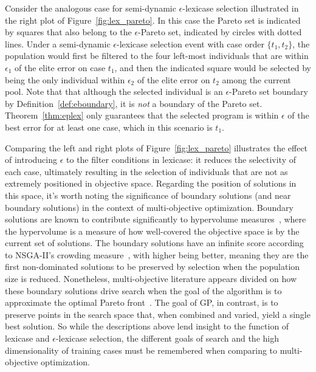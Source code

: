 \documentclass[twoside]{article}
\begin{document}
Consider the analogous case for semi-dynamic $\epsilon$-lexicase selection illustrated in the right plot of Figure~\ref{fig:lex_pareto}. In this case the Pareto set is indicated by squares that also belong to the $\epsilon$-Pareto set, indicated by circles with dotted lines. Under a semi-dynamic $\epsilon$-lexicase selection event with case order $\{t_1, t_2\}$, the population would first be filtered to the four left-most individuals that are within $\epsilon_1$ of the elite error on case $t_1$, and then the indicated square would be selected by being the only individual within $\epsilon_2$ of the elite error on $t_2$ among the current pool. Note that that although the selected individual is an $\epsilon$-Pareto set boundary by Definition~\ref{def:eboundary}, it is {\it not} a boundary of the Pareto set. Theorem~\ref{thm:eplex} only guarantees that the selected program is within $\epsilon$ of the best error for at least one case, which in this scenario is $t_1$. 

Comparing the left and right plots of Figure~\ref{fig:lex_pareto} illustrates the effect of introducing $\epsilon$ to the filter conditions in lexicase: it reduces the selectivity of each case, ultimately resulting in the selection of individuals that are not as extremely positioned in objective space. Regarding the position of solutions in this space, it's worth noting the significance of boundary solutions (and near boundary solutions) in the context of multi-objective optimization. Boundary solutions are known to contribute significantly to hypervolume measures~\citep{deb_evaluating_2005}, where the hypervolume is a measure of how well-covered the objective space is by the current set of solutions. The boundary solutions have an infinite score according to NSGA-II's crowding measure~\citep{schoenauer_fast_2000}, with higher being better, meaning they are the first non-dominated solutions to be preserved by selection when the population size is reduced. Nonetheless, multi-objective literature appears divided on how these boundary solutions drive search when the goal of the algorithm is to approximate the optimal Pareto front~\citep{wagner_pareto-_2007}. The goal of GP, in contrast, is to preserve points in the search space that, when combined and varied, yield a single best solution. So while the descriptions above lend insight to the function of lexicase and $\epsilon$-lexicase selection, the different goals of search and the high dimensionality of training cases must be remembered when comparing to multi-objective optimization. 
\end{document}
